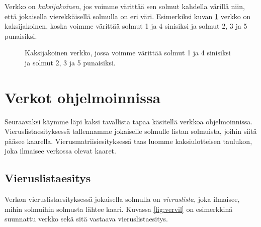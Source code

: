 Verkko on \emph{kaksijakoinen}, jos voimme värittää sen
solmut kahdella värillä niin, että jokaisella
vierekkäisellä solmulla on eri väri.
Esimerkiksi kuvan \ref{fig:verkak} verkko on kaksijakoinen,
koska voimme värittää solmut 1 ja 4 sinisiksi ja
solmut 2, 3 ja 5 punaisiksi.

\begin{figure}
\center
\begin{center}
\end{center}
\caption{Kaksijakoinen verkko, jossa voimme värittää solmut 1 ja 4
sinisiksi ja solmut 2, 3 ja 5 punaisiksi.}
\label{fig:verkak}
\end{figure}

\section{Verkot ohjelmoinnissa}

Seuraavaksi käymme läpi kaksi tavallista tapaa
käsitellä verkkoa ohjelmoinnissa.
Vieruslistaesityksessä tallennamme jokaiselle
solmulle listan solmuista, joihin siitä pääsee kaarella.
Vierusmatriisiesityksessä taas luomme kaksiulotteisen
taulukon, joka ilmaisee verkossa olevat kaaret.

\subsection{Vieruslistaesitys}

Verkon vieruslistaesityksessä jokaisella solmulla on
\emph{vieruslista}, joka ilmaisee, mihin solmuihin
solmusta lähtee kaari.
Kuvassa \ref{fig:vervil} on esimerkkinä suunnattu verkko
sekä sitä vastaava vieruslistaesitys.

